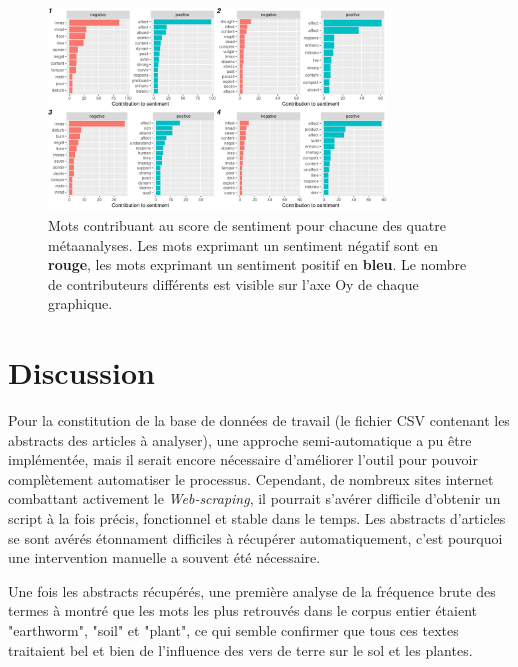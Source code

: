 \documentclass{book}
\begin{document}
\begin{figure}[htb] %
    \begin{center} %
        \includegraphics[width=0.8\textwidth]{senti_contri_each.png}
        \caption[Contributions de chaque racine au sentiment global pour chaque métaanalyse]{Mots contribuant au score de sentiment pour chacune des quatre métaanalyses. Les mots exprimant un sentiment négatif sont en \textbf{rouge}, les mots exprimant un sentiment positif en \textbf{bleu}. Le nombre de contributeurs différents est visible sur l'axe Oy de chaque graphique.\label{senti_contri_each}}
    \end{center}  
\end{figure}
\FloatBarrier

\chapter{\label{Quatrieme Chapitre}Discussion}
\noindent
Pour la constitution de la base de données de travail (le fichier CSV contenant les abstracts des articles à analyser), une approche semi-automatique a pu être implémentée, mais il serait encore nécessaire d'améliorer l'outil pour pouvoir complètement automatiser le processus. Cependant, de nombreux sites internet combattant activement le \textit{Web-scraping}, il pourrait s'avérer difficile d'obtenir un script à la fois précis, fonctionnel et stable dans le temps. Les abstracts d'articles se sont avérés étonnament difficiles à récupérer automatiquement, c'est pourquoi une intervention manuelle a souvent été nécessaire.

Une fois les abstracts récupérés, une première analyse de la fréquence brute des termes à montré que les mots les plus retrouvés dans le corpus entier étaient "earthworm", "soil" et "plant", ce qui semble confirmer que tous ces textes traitaient bel et bien de l'influence des vers de terre sur le sol et les plantes.
\end{document}
